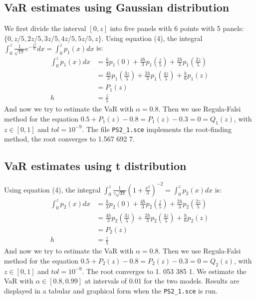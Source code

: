 \documentclass[10pt, twocolumn]{article}
\begin{document}
		\subsection{VaR estimates using Gaussian distribution}
		We first divide the interval $[0, z]$ into five panels with 6 points with 5 panels: $\{0, z/5, 2z/5, 3z/5, 4z/5, 5z/5, z\}$.
		Using equation (4), the integral $\int_{0}^{z}\frac{1}{\sqrt{1\pi}}e^{-\frac{x^2}{6}}dx = \int_{0}^{z}p_1(x)dx$ is:
		$$
		\begin{aligned}
			\int_{0}^{z}p_1(x)dx &= \frac{h}{3}p_1(0) + \frac{4h}{3}p_1\left(\frac{z}{5}\right) + \frac{2h}{3}p_1\left(\frac{2z}{5}\right)\\
				&= \frac{4h}{3}p_1\left(\frac{3z}{5}\right) + \frac{2h}{3}p_1\left(\frac{4z}{5}\right) + \frac{h}{6}p_1(z)\\
				&= P_1(z)\\
				h &= \frac{z}{5}
		\end{aligned}
		$$
		And now we try to estimate the VaR with $\alpha=0.8$.
		Then we use Regula-Falsi method for the equation $0.5 + P_1(z) - 0.8 = P_1(z)-0.3=0=Q_1(z)$, with $z\in[0,1]$ and $tol=10^{-9}$.
		The file \texttt{PS2\_1.sce} implements the root-finding method, the root converges to 1.567 692 7.
		
		\subsection{VaR estimates using t distribution}
		Using equation (4), the integral $\int_{0}^{z}\frac{1}{\gamma\sqrt{3\pi}}\left(1+\frac{x^2}{3}\right)^{-2} = \int_{0}^{z}p_2(x)dx$ is:
		$$
		\begin{aligned}
			\int_{0}^{z}p_2(x)dx &= \frac{h}{3}p_2(0) + \frac{4h}{3}p_2\left(\frac{z}{5}\right) + \frac{2h}{3}p_2\left(\frac{2z}{5}\right)\\
				&= \frac{4h}{3}p_2\left(\frac{3z}{5}\right) + \frac{2h}{3}p_2\left(\frac{4z}{5}\right) + \frac{h}{6}p_2(z)\\
				&= P_2(z)\\
				h &= \frac{z}{5}
		\end{aligned}
		$$
		And now we try to estimate the VaR with $\alpha=0.8$.
		Then we use Regula-Falsi method for the equation $0.5 + P_2(z) - 0.8 = P_2(z)-0.3=0=Q_2(z)$, with $z\in[0,1]$ and $tol=10^{-9}$.
		The root converges to 1. 053 385 1.
		We estimate the VaR with $\alpha\in[0.8, 0.99]$ at intervals of 0.01 for the two models.
		Results are displayed in a tabular and graphical form when the \texttt{PS2\_1.sce} is run.
		
\end{document}
